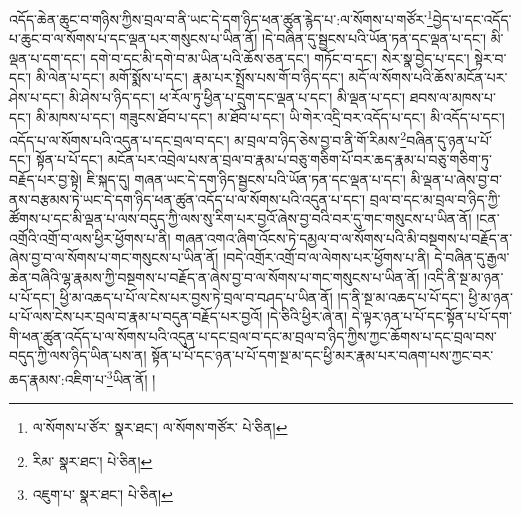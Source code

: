 འདོད་ཆེན་ཆུང་བ་གཉིས་ཀྱིས་བྲལ་བ་ནི་ཡང་དེ་དག་ཉིད་ཕན་ཚུན་རྙེད་པ་:ལ་སོགས་པ་གཙོར་\footnote{ལ་སོགས་པ་ཙོར་  སྣར་ཐང་། ལ་སོགས་གཙོར་  པེ་ཅིན། }བྱེད་པ་དང་འདོད་པ་ཆུང་བ་ལ་སོགས་པ་དང་ལྡན་པར་གསུངས་པ་ཡིན་ནོ། །དེ་བཞིན་དུ་སྦྱངས་པའི་ཡོན་ཏན་དང་ལྡན་པ་དང་། མི་ལྡན་པ་དག་དང་། དགེ་བ་དང་མི་དགེ་བ་མ་ཡིན་པའི་ཆོས་ཅན་དང་། གཏོང་བ་དང་། སེར་སྣ་བྱེད་པ་དང་། སྟེར་བ་དང་། མི་ལེན་པ་དང་། མགོ་སྨོས་པ་དང་། རྣམ་པར་སྤྲོས་པས་གོ་བ་ཉིད་དང་། མདོ་ལ་སོགས་པའི་ཆོས་མངོན་པར་ཤེས་པ་དང་། མི་ཤེས་པ་ཉིད་དང་། ཕ་རོལ་ཏུ་ཕྱིན་པ་དྲུག་དང་ལྡན་པ་དང་། མི་ལྡན་པ་དང་། ཐབས་ལ་མཁས་པ་དང་། མི་མཁས་པ་དང་། གཟུངས་ཐོབ་པ་དང་། མ་ཐོབ་པ་དང་། ཡི་གེར་འདྲི་བར་འདོད་པ་དང་། མི་འདོད་པ་དང་། འདོད་པ་ལ་སོགས་པའི་འདུན་པ་དང་བྲལ་བ་དང་། མ་བྲལ་བ་ཉིད་ཅེས་བྱ་བ་ནི་གོ་རིམས་\footnote{རིམ་  སྣར་ཐང་།  པེ་ཅིན། }བཞིན་དུ་ཉན་པ་པོ་དང་། སྟོན་པ་པོ་དང་། མངོན་པར་འབྲེལ་པས་ན་བྲལ་བ་རྣམ་པ་བཅུ་གཅིག་པོ་བར་ཆད་རྣམ་པ་བཅུ་གཅིག་ཏུ་བརྗོད་པར་བྱ་སྟེ། ཇི་སྐད་དུ། གཞན་ཡང་དེ་དག་ཉིད་སྦྱངས་པའི་ཡོན་ཏན་དང་ལྡན་པ་དང་། མི་ལྡན་པ་ཞེས་བྱ་བ་ནས་བརྩམས་ཏེ་ཡང་དེ་དག་ཉིད་ཕན་ཚུན་འདོད་པ་ལ་སོགས་པའི་འདུན་པ་དང་། བྲལ་བ་དང་མ་བྲལ་བ་ཉིད་ཀྱི་ཚོགས་པ་དང་མི་ལྡན་པ་ལས་བདུད་ཀྱི་ལས་སུ་རིག་པར་བྱའོ་ཞེས་བྱ་བའི་བར་དུ་གང་གསུངས་པ་ཡིན་ནོ། །ངན་འགྲོའི་འགྲོ་བ་ལས་ཕྱིར་ཕྱོགས་པ་ནི། གཞན་འགའ་ཞིག་འོངས་ཏེ་དམྱལ་བ་ལ་སོགས་པའི་མི་བསྔགས་པ་བརྗོད་ན་ཞེས་བྱ་བ་ལ་སོགས་པ་གང་གསུངས་པ་ཡིན་ནོ། །བདེ་འགྲོར་འགྲོ་བ་ལ་ལེགས་པར་ཕྱོགས་པ་ནི། དེ་བཞིན་དུ་རྒྱལ་ཆེན་བཞིའི་ལྷ་རྣམས་ཀྱི་བསྔགས་པ་བརྗོད་ན་ཞེས་བྱ་བ་ལ་སོགས་པ་གང་གསུངས་པ་ཡིན་ནོ། །འདི་ནི་སྔ་མ་ཉན་པ་པོ་དང་། ཕྱི་མ་འཆད་པ་པོ་ལ་ངེས་པར་བྱས་ཏེ་བྲལ་བ་བཤད་པ་ཡིན་ནོ། །ད་ནི་སྔ་མ་འཆད་པ་པོ་དང་། ཕྱི་མ་ཉན་པ་པོ་ལས་ངེས་པར་བྲལ་བ་རྣམ་པ་བདུན་བརྗོད་པར་བྱའོ། །དེ་ཅིའི་ཕྱིར་ཞེ་ན། དེ་ལྟར་ཉན་པ་པོ་དང་སྟོན་པ་པོ་དག་གི་ཕན་ཚུན་འདོད་པ་ལ་སོགས་པའི་འདུན་པ་དང་བྲལ་བ་དང་མ་བྲལ་བ་ཉིད་ཀྱིས་ཀྱང་ཆོགས་པ་དང་བྲལ་བས་བདུད་ཀྱི་ལས་ཉིད་ཡིན་པས་ན། སྟོན་པ་པོ་དང་ཉན་པ་པོ་དག་སྔ་མ་དང་ཕྱི་མར་རྣམ་པར་བཞག་པས་ཀྱང་བར་ཆད་རྣམས་:འཇིག་པ་\footnote{འཇུག་པ་  སྣར་ཐང་།  པེ་ཅིན། }ཡིན་ནོ། །
